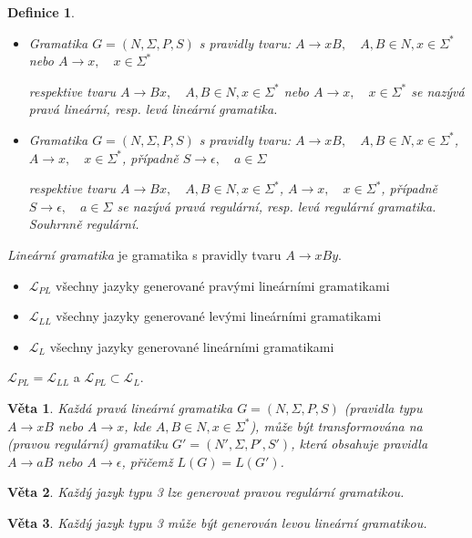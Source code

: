 \documentclass[a4paper, 11pt]{report}
\newtheorem{mydef}{Definice}[chapter]
\newtheorem{veta}{Věta}[chapter]
\begin{document}
\begin{mydef}
\begin{itemize}
	\item Gramatika $G = (N, \Sigma, P, S)$ s pravidly tvaru:
	$A \to xB, \quad A, B \in N, x \in \Sigma^*$ nebo
	$A \to x, \quad x \in \Sigma^*$

	respektive tvaru
	$A \to Bx, \quad A, B \in N, x \in \Sigma^*$ nebo
	$A \to x, \quad x \in \Sigma^*$
	se nazývá \emph{pravá lineární}, resp. \emph{levá lineární} gramatika.
	\item Gramatika $G = (N, \Sigma, P, S)$ s pravidly tvaru:
	$A \to xB, \quad A, B \in N, x \in \Sigma^*$,
	$A \to x, \quad x \in \Sigma^*$, případně
	$S \to \epsilon, \quad a \in \Sigma$

	respektive tvaru
	$A \to Bx, \quad A, B \in N, x \in \Sigma^*$,
	$A \to x, \quad x \in \Sigma^*$, případně
	$S \to \epsilon, \quad a \in \Sigma$
	se nazývá \emph{pravá regulární}, resp. \emph{levá regulární} gramatika. Souhrnně \emph{regulární}.
\end{itemize}
\end{mydef}

\emph{Lineární gramatika} je gramatika s pravidly tvaru $A \to xBy$.
\begin{itemize}
	\item $\mathcal{L}_{PL}$ všechny jazyky generované pravými lineárními gramatikami
	\item $\mathcal{L}_{LL}$ všechny jazyky generované levými lineárními gramatikami
	\item $\mathcal{L}_{L}$ všechny jazyky generované lineárními gramatikami
\end{itemize}
$\mathcal{L}_{PL} = \mathcal{L}_{LL}$ a $\mathcal{L}_{PL} \subset \mathcal{L}_{L}$.

\begin{veta}
Každá pravá lineární gramatika $G = (N, \Sigma, P, S)$ (pravidla typu $A \to xB$ nebo $A \to x$, kde $A, B \in N, x \in \Sigma^*$), může být transformována na (pravou regulární) gramatiku $G' = (N', \Sigma, P', S')$, která obsahuje pravidla $A \to aB$ nebo $A \to \epsilon$, přičemž $L(G) = L(G')$.
\end{veta}

\begin{veta}
Každý jazyk typu 3 lze generovat pravou regulární gramatikou.
\end{veta}

\begin{veta}
Každý jazyk typu 3 může být generován levou lineární gramatikou.
\end{veta}
\end{document}
